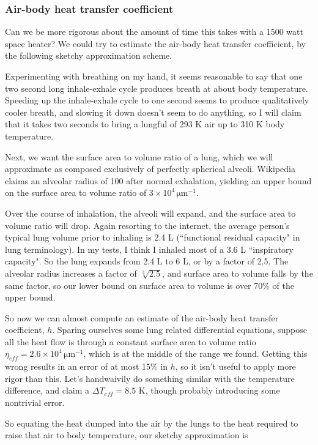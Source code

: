 \documentclass[12pt]{article}
\begin{document}
\subsubsection{Air-body heat transfer coefficient}

Can we be more rigorous about the amount of time this takes with a 1500 watt space heater? We could try to estimate the air-body heat transfer coefficient, by the following sketchy approximation scheme.

Experimenting with breathing on my hand, it seems reasonable to say that one two second long inhale-exhale cycle produces breath at about body temperature. Speeding up the inhale-exhale cycle to one second seems to produce qualitatively cooler breath, and slowing it down doesn't seem to do anything, so I will claim that  it takes two seconds to bring a lungful of 293 K air up to 310 K body temperature.

Next, we want the surface area to volume ratio of a lung, which we will approximate as composed exclusively of perfectly spherical alveoli. Wikipedia claims an alveolar radius of 100 \micron after normal exhalation, yielding an upper bound on the surface area to volume ratio of \(3\times10^4 \,\mathrm{\mu m}^{-1}\).

Over the course of inhalation, the alveoli will expand, and the surface area to volume ratio will drop. Again resorting to the internet, the average person's typical lung volume prior to inhaling is 2.4 L (``functional residual capacity" in lung terminology). In my tests, I think I inhaled most of a 3.6 L ``inspiratory capacity". So the lung expands from 2.4 L to 6 L, or by a factor of 2.5. The alveolar radius increases a factor of \(\sqrt[3]{2.5}\), and surface area to volume falls by the same factor, so our lower bound on surface area to volume is over 70\% of the upper bound.

So now we can almost compute an estimate of the air-body heat transfer coefficient, \(h\). Sparing ourselves some lung related differential equations, suppose all the heat flow is through a constant surface area to volume ratio \(\eta_{eff} = 2.6 \times 10^4 \,\mathrm{\mu m}^{-1}\), which is at the middle of the range we found. Getting this wrong results in an error of at most 15\% in \(h\), so it isn't useful to apply more rigor than this. Let's handwaivily do something similar with the temperature difference, and claim a \(\Delta T_{eff} = 8.5\) K, though probably introducing some nontrivial error.

So equating the heat dumped into the air by the lungs to the heat required to raise that air to body temperature, our sketchy approximation is
\end{document}
